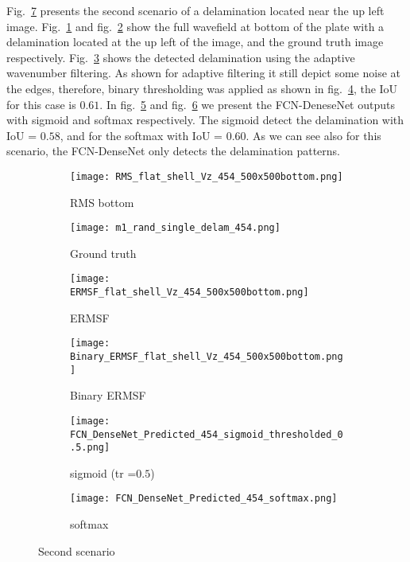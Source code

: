 	Fig.~\ref{fig:RMS454} presents the second scenario of a delamination located near the up left image.
	Fig.~\ref{fig:dispersion30deg_direct} and fig.~\ref{fig:m1_rand_single_delam_454} show the full wavefield at bottom of the plate with a delamination located at the up left of the image, and the ground truth image respectively.
	Fig.~\ref{fig:ERMSF_flat_shell_Vz_454} shows the detected delamination using the adaptive wavenumber filtering.
	As shown for adaptive filtering it still depict some noise at the edges, therefore, binary thresholding was applied as shown in fig.~\ref{fig:Binary_ERMSF}, the IoU for this case is \(0.61\).
	In fig.~\ref{fig:predict_454_sigmoid_tr_0.5} and fig.~\ref{fig:predict_454_softmax} we present the FCN-DeneseNet outputs with sigmoid and softmax respectively.
	The sigmoid detect the delamination with IoU = \(0.58\), and for the softmax with IoU = \(0.60\).
	As we can see also for this scenario, the FCN-DenseNet only detects the delamination patterns.
	\begin{figure} [H]
		\centering
		\begin{subfigure}[b]{0.47\textwidth}
			\centering
			\texttt{[image: RMS\_flat\_shell\_Vz\_454\_500x500bottom.png]}
			\caption{RMS bottom}
			\label{fig:dispersion30deg_direct}
		\end{subfigure}
		\hfill
		\begin{subfigure}[b]{0.47\textwidth}
			\centering
			\texttt{[image: m1\_rand\_single\_delam\_454.png]}
			\caption{Ground truth}
			\label{fig:m1_rand_single_delam_454}
		\end{subfigure}
		\hfill
		\begin{subfigure}[b]{0.47\textwidth}
			\centering
			\texttt{[image: ERMSF\_flat\_shell\_Vz\_454\_500x500bottom.png]}
			\caption{ERMSF}
			\label{fig:ERMSF_flat_shell_Vz_454}
		\end{subfigure}
		\hfill
		\begin{subfigure}[b]{0.47\textwidth}
			\centering
			\texttt{[image: Binary\_ERMSF\_flat\_shell\_Vz\_454\_500x500bottom.png]}
			\caption{Binary ERMSF}
			\label{fig:Binary_ERMSF}
		\end{subfigure}
		\hfill
		\begin{subfigure}[b]{0.47\textwidth}
			\centering
			\texttt{[image: FCN\_DenseNet\_Predicted\_454\_sigmoid\_thresholded\_0.5.png]}
			\caption{sigmoid (tr =\(0.5\))}
			\label{fig:predict_454_sigmoid_tr_0.5}
		\end{subfigure}
		\hfill	
		\begin{subfigure}[b]{0.47\textwidth}
			\centering
			\texttt{[image: FCN\_DenseNet\_Predicted\_454\_softmax.png]}
			\caption{softmax}
			\label{fig:predict_454_softmax}
		\end{subfigure}
		\caption{Second scenario}
		\label{fig:RMS454}
	\end{figure} 
